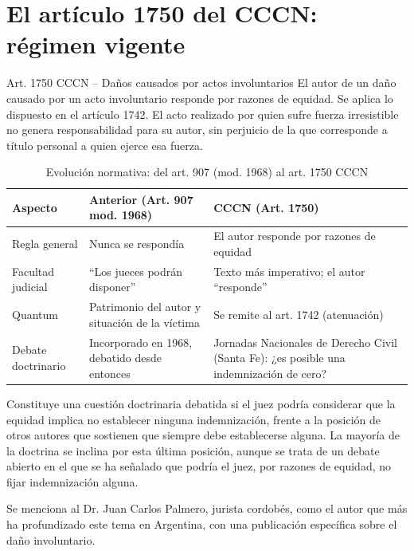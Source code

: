 \documentclass[12pt,oneside]{book}
\begin{document}
\section{El artículo 1750 del CCCN: régimen vigente}

\begin{definition}{Art. 1750 CCCN -- Daños causados por actos involuntarios}
El autor de un daño causado por un acto involuntario responde por razones de equidad. Se aplica lo dispuesto en el artículo 1742. El acto realizado por quien sufre fuerza irresistible no genera responsabilidad para su autor, sin perjuicio de la que corresponde a título personal a quien ejerce esa fuerza.
\end{definition}

\begin{table}[H]
\centering
\caption{Evolución normativa: del art. 907 (mod. 1968) al art. 1750 CCCN}
\begin{tabularx}{\textwidth}{l X X}
\toprule
\textbf{Aspecto} & \textbf{Anterior (Art. 907 mod. 1968)} & \textbf{CCCN (Art. 1750)} \\
\midrule
Regla general & Nunca se respondía & El autor responde por razones de equidad \\
Facultad judicial & ``Los jueces podrán disponer'' & Texto más imperativo; el autor ``responde'' \\
Quantum & Patrimonio del autor y situación de la víctima & Se remite al art. 1742 (atenuación) \\
Debate doctrinario & Incorporado en 1968, debatido desde entonces & Jornadas Nacionales de Derecho Civil (Santa Fe): ¿es posible una indemnización de cero? \\
\bottomrule
\end{tabularx}
\end{table}

\begin{note}
Constituye una cuestión doctrinaria debatida si el juez podría considerar que la equidad implica no establecer ninguna indemnización, frente a la posición de otros autores que sostienen que siempre debe establecerse alguna. La mayoría de la doctrina se inclina por esta última posición, aunque se trata de un debate abierto en el que se ha señalado que podría el juez, por razones de equidad, no fijar indemnización alguna.

Se menciona al Dr. Juan Carlos Palmero, jurista cordobés, como el autor que más ha profundizado este tema en Argentina, con una publicación específica sobre el daño involuntario.
\end{note}
\end{document}
